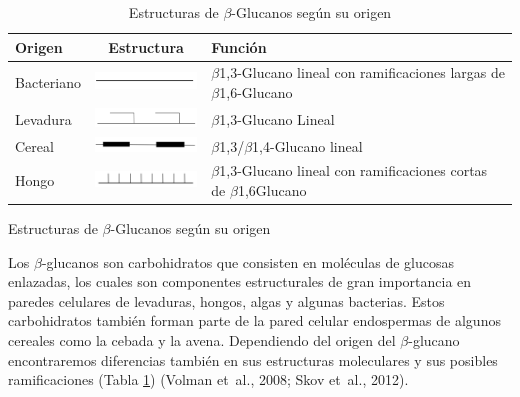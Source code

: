 \documentclass[12pt,letterpaper,oneside]{scrbook}
\begin{document}
\begin{table}[h!]
    \sffamily
    \begin{center}
        \begin{threeparttable}
            \caption{Estructuras de $\beta$-Glucanos según su origen}\label{tablaglucanos}
            \begin{tabularx}{13cm}{l c X}
                \toprule
                Origen & Estructura & Función \\
                \midrule
                Bacteriano & \includegraphics[width=3cm]{bgbacteriano} & $\beta$1,3-Glucano lineal con ramificaciones largas de $\beta$1,6-Glucano\\
                Levadura & \includegraphics[width=3cm]{bglevadura} & $\beta$1,3-Glucano Lineal \\ 
                Cereal & \includegraphics[width=3cm]{bgcereal} & $\beta$1,3/$\beta$1,4-Glucano lineal \\
                Hongo & \includegraphics[width=3cm]{bghongo} & $\beta$1,3-Glucano lineal con ramificaciones cortas de $\beta$1,6Glucano \\
                \bottomrule
            \end{tabularx}
            \begin{tablenotes}
                \item Estructuras de $\beta$-Glucanos según su origen
            \end{tablenotes}
        \end{threeparttable}
    \end{center}
\end{table}

Los \(\beta\)-glucanos son carbohidratos que consisten en moléculas de
glucosas enlazadas, los cuales son componentes estructurales de gran
importancia en paredes celulares de levaduras, hongos, algas y algunas
bacterias. Estos carbohidratos también forman parte de la pared celular
endospermas de algunos cereales como la cebada y la avena. Dependiendo
del origen del \(\beta\)-glucano encontraremos diferencias también en
sus estructuras moleculares y sus posibles ramificaciones (Tabla
\ref{tablaglucanos}) (Volman et~al., 2008; Skov et~al., 2012).
\end{document}
